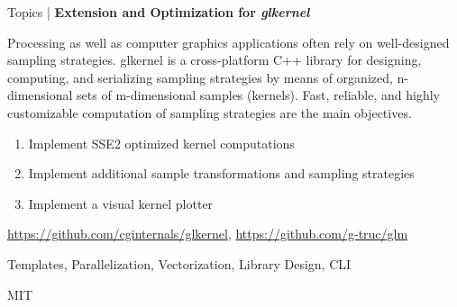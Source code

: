 \begin{frame}{Topics | \textbf{Extension and Optimization for \emph{glkernel}}}
	
	\begin{description}[C++ Competencies]
		\item[Description] Processing as well as computer graphics applications often rely on well-designed sampling strategies. glkernel is a cross-platform C++ library for designing, computing, and serializing sampling strategies by means of organized, n-dimensional sets of m-dimensional samples (kernels). Fast, reliable, and highly customizable computation of sampling strategies are the main objectives.
		\item[Goals] \begin{enumerate}
				\item Implement SSE2 optimized kernel computations
				\item Implement additional sample transformations and sampling strategies
				\item Implement a visual kernel plotter
			\end{enumerate}
		\item[Starting Points] \url{https://github.com/cginternals/glkernel}, \url{https://github.com/g-truc/glm}
		\item[C++ Competencies] Templates, Parallelization, Vectorization, Library Design, CLI
		\item[License] MIT
	\end{description}
	
\end{frame}


